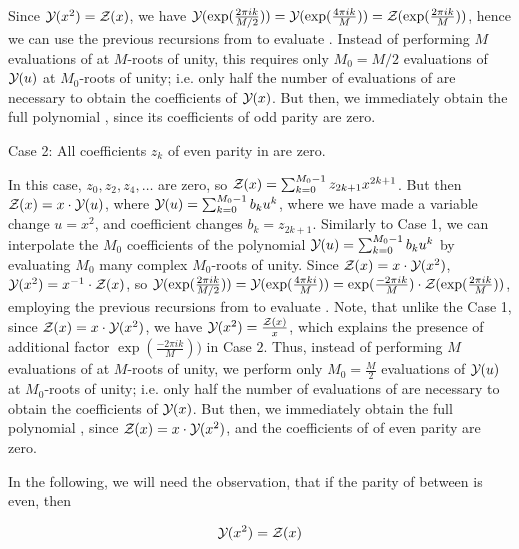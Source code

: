 Since ${\mathcal Y}_{}(x^2)={\mathcal Z}_{}(x)$, we have
${\mathcal Y}_{}(\exp(\frac{2\pi i k}{M/2})) =
{\mathcal Y}_{}(\exp(\frac{4\pi i k}{M})) =
{\mathcal Z}_{}(\exp(\frac{2\pi i k}{M}))$, hence we can
use the previous recursions from 
to evaluate .  Instead of
performing $M$ evaluations of \fullZx at $M$-roots of unity,
this requires only $M_0=M/2$ evaluations of ${\mathcal Y}_{}(u)$ at
$M_0$-roots of unity; i.e. only half the number of
evaluations of \fullZx are necessary to
obtain the coefficients of ${\mathcal Y}_{}(x)$. But then, we immediately obtain the
full polynomial \fullZx, since its coefficients of odd parity are zero.

\medskip
{\sc Case 2}: All coefficients $z_k$ of even parity in
 are zero.
\smallskip

In this case, $z_0,z_2,z_4,\dots$ are zero, so
${\mathcal Z}_{}(x) = \sum_{k=0}^{M_0-1} z_{2k+1} x^{2k+1}$. But then
${\mathcal Z}_{}(x) = x \cdot {\mathcal Y}_{}(u)$, where
${\mathcal Y}_{}(u)= \sum_{k=0}^{M_0-1} b_k u^k$, where we have made
a variable change $u=x^2$, and coefficient changes
$b_k = z_{2k+1}$. Similarly to Case 1,
we can interpolate the $M_0$ coefficients of the polynomial
${\mathcal Y}_{}(u) = \sum_{k=0}^{M_0-1} b_k u^k$
by evaluating $M_0$ many complex $M_0$-roots
of unity.  Since ${\mathcal Z}_{}(x)=x \cdot {\mathcal Y}_{}(x^2)$, ${\mathcal Y}_{}(x^2) = x^{-1} \cdot {\mathcal Z}_{}(x)$,
so
${\mathcal Y}_{}(\exp(\frac{2\pi i k}{M/2})) = {\mathcal Y}_{}(\exp(\frac{4\pi ki}{M})) =
\exp(\frac{-2\pi i k}{M}) \cdot
{\mathcal Z}_{}(\exp(\frac{2\pi i k}{M}))$, employing
the previous recursions from 
to evaluate .  Note, that unlike the
Case 1, since ${\mathcal Z}_{}(x) = x \cdot {\mathcal Y}_{}(x^2)$, we have
${\mathcal Y}_{}(x^2)=\frac{{\mathcal Z}_{}(x)}{x}$, which explains the presence of additional factor
$\exp(\frac{-2\pi i k}{M}))$ in Case $2$.  Thus, instead of
performing $M$ evaluations of \fullZx at $M$-roots of unity,
we perform only $M_0=\frac{M}{2}$ evaluations of ${\mathcal Y}_{}(u)$ at
$M_0$-roots of unity; i.e. only half the number of
evaluations of \fullZx are necessary to
obtain the coefficients of ${\mathcal Y}_{}(x)$. But then, we immediately obtain the
full polynomial \fullZx, since ${\mathcal Z}_{}(x) = x \cdot {\mathcal Y}_{}(x^2)$, and the
coefficients of \fullZx of even parity are zero.

In the following, we will need the observation, that if the parity of
\bpd \dBP{\strA}{\strB} between \strAB is
even, then

\begin{align}
\label{eq:ffttwo:evenY}
\emYof{}{x^2} = \fullZx
\end{align}

